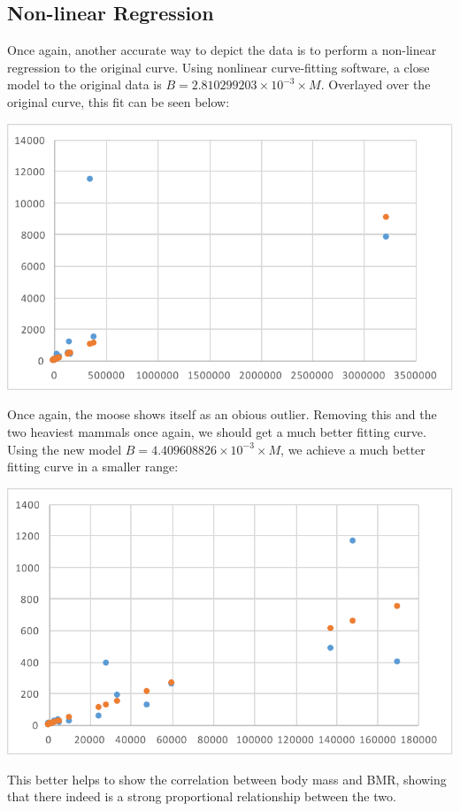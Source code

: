 \documentclass[10pt,letterpaper]{article}
\begin{document}
		\subsection{Non-linear Regression}
			Once again, another accurate way to depict the data is to perform a non-linear regression to the original curve. Using nonlinear curve-fitting software, a close model to the original data is $B =2.810299203 \times 10^{-3} \times M$. Overlayed over the original curve, this fit can be seen below:
			\newline \newline
			\centerline{\includegraphics{Picture13.pdf}}
			\newline \newline
			Once again, the moose shows itself as an obious outlier. Removing this and the two heaviest mammals once again, we should get a much better fitting curve. Using the new model $B = 4.409608826 \times 10^{-3} \times M$, we achieve a much better fitting curve in a smaller range: 
			\newline \newline
			\centerline{\includegraphics{Picture14.pdf}}
			\newline \newline
			This better helps to show the correlation between body mass and BMR, showing that there indeed is a strong proportional relationship between the two.
\end{document}
